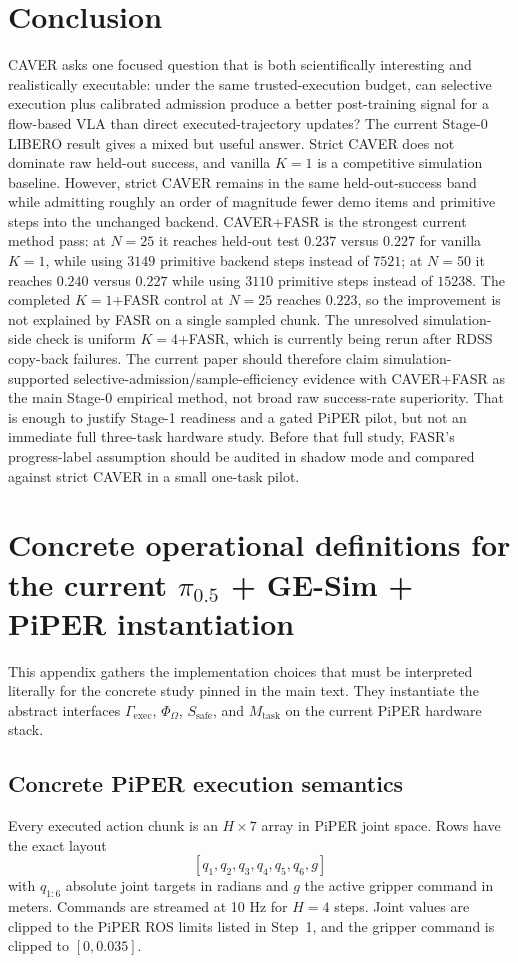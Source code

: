 \documentclass[10pt]{article}
\theoremstyle{plain}
\theoremstyle{definition}
\theoremstyle{remark}
\begin{document}
\section{Conclusion}
CAVER asks one focused question that is both scientifically interesting and realistically executable: under the same trusted-execution budget, can selective execution plus calibrated admission produce a better post-training signal for a flow-based VLA than direct executed-trajectory updates? The current Stage-0 LIBERO result gives a mixed but useful answer. Strict CAVER does not dominate raw held-out success, and vanilla $K=1$ is a competitive simulation baseline. However, strict CAVER remains in the same held-out-success band while admitting roughly an order of magnitude fewer demo items and primitive steps into the unchanged backend. CAVER+FASR is the strongest current method pass: at $N=25$ it reaches held-out test $0.237$ versus $0.227$ for vanilla $K=1$, while using $3149$ primitive backend steps instead of $7521$; at $N=50$ it reaches $0.240$ versus $0.227$ while using $3110$ primitive steps instead of $15238$. The completed $K=1$+FASR control at $N=25$ reaches $0.223$, so the improvement is not explained by FASR on a single sampled chunk. The unresolved simulation-side check is uniform $K=4$+FASR, which is currently being rerun after RDSS copy-back failures. The current paper should therefore claim simulation-supported selective-admission/sample-efficiency evidence with CAVER+FASR as the main Stage-0 empirical method, not broad raw success-rate superiority. That is enough to justify Stage-1 readiness and a gated PiPER pilot, but not an immediate full three-task hardware study. Before that full study, FASR's progress-label assumption should be audited in shadow mode and compared against strict CAVER in a small one-task pilot.

\appendix
\section{Concrete operational definitions for the current \texorpdfstring{$\pi_{0.5}$}{pi0.5} + GE-Sim + PiPER instantiation}
This appendix gathers the implementation choices that must be interpreted literally for the concrete study pinned in the main text. They instantiate the abstract interfaces $\Gamma_{\mathrm{exec}}$, $\Phi_{\Omega}$, $S_{\mathrm{safe}}$, and $M_{\mathrm{task}}$ on the current PiPER hardware stack.

\subsection{Concrete PiPER execution semantics}
Every executed action chunk is an $H\times 7$ array in PiPER joint space. Rows have the exact layout
\[
[q_1,q_2,q_3,q_4,q_5,q_6,g]
\]
with $q_{1:6}$ absolute joint targets in radians and $g$ the active gripper command in meters. Commands are streamed at 10 Hz for $H=4$ steps. Joint values are clipped to the PiPER ROS limits listed in Step~1, and the gripper command is clipped to $[0,0.035]$.
\end{document}
